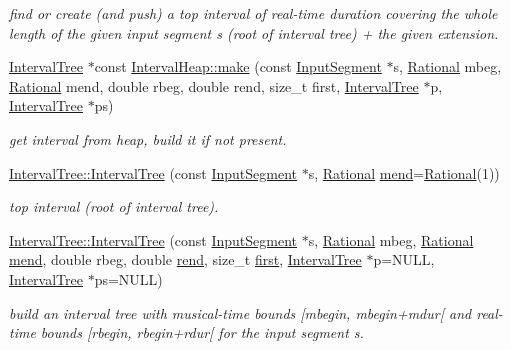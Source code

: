 \begin{DoxyCompactItemize}
\begin{DoxyCompactList}\small\item\em find or create (and push) a top interval of real-\/time duration covering the whole length of the given input segment s (root of interval tree) + the given extension. \end{DoxyCompactList}\item 
\mbox{\hyperlink{classIntervalTree}{Interval\+Tree}} $\ast$const \mbox{\hyperlink{group__segment_gad886d53d2881a80f06c6f9fbf202d727}{Interval\+Heap\+::make}} (const \mbox{\hyperlink{classInputSegment}{Input\+Segment}} $\ast$s, \mbox{\hyperlink{classRational}{Rational}} mbeg, \mbox{\hyperlink{classRational}{Rational}} mend, double rbeg, double rend, size\+\_\+t first, \mbox{\hyperlink{classIntervalTree}{Interval\+Tree}} $\ast$p, \mbox{\hyperlink{classIntervalTree}{Interval\+Tree}} $\ast$ps)
\begin{DoxyCompactList}\small\item\em get interval from heap, build it if not present. \end{DoxyCompactList}\item 
\mbox{\hyperlink{group__segment_gab092e4338aa4c3369c4fa4404d8706b0}{Interval\+Tree\+::\+Interval\+Tree}} (const \mbox{\hyperlink{classInputSegment}{Input\+Segment}} $\ast$s, \mbox{\hyperlink{classRational}{Rational}} \mbox{\hyperlink{classInterval_a963b9b36f085a7db9c159c55608f8408}{mend}}=\mbox{\hyperlink{classRational}{Rational}}(1))
\begin{DoxyCompactList}\small\item\em top interval (root of interval tree). \end{DoxyCompactList}\item 
\mbox{\hyperlink{group__segment_gac16f2a8d9c584a869bbed6a263914360}{Interval\+Tree\+::\+Interval\+Tree}} (const \mbox{\hyperlink{classInputSegment}{Input\+Segment}} $\ast$s, \mbox{\hyperlink{classRational}{Rational}} mbeg, \mbox{\hyperlink{classRational}{Rational}} \mbox{\hyperlink{classInterval_a963b9b36f085a7db9c159c55608f8408}{mend}}, double rbeg, double \mbox{\hyperlink{classInterval_a1acb3128311a318b23e68cc8ca0182e9}{rend}}, size\+\_\+t \mbox{\hyperlink{classAlignedInterval_a1660736ae6e829e6c92616e49784a583}{first}}, \mbox{\hyperlink{classIntervalTree}{Interval\+Tree}} $\ast$p=N\+U\+LL, \mbox{\hyperlink{classIntervalTree}{Interval\+Tree}} $\ast$ps=N\+U\+LL)
\begin{DoxyCompactList}\small\item\em build an interval tree with musical-\/time bounds \mbox{[}mbegin, mbegin+mdur\mbox{[} and real-\/time bounds \mbox{[}rbegin, rbegin+rdur\mbox{[} for the input segment s. \end{DoxyCompactList}\item 

\end{DoxyCompactItemize}
